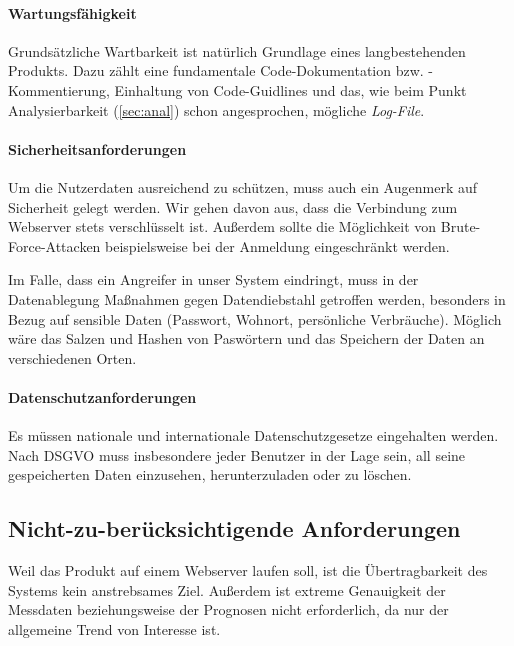 \paragraph{Wartungsfähigkeit}

Grundsätzliche Wartbarkeit ist natürlich Grundlage eines langbestehenden Produkts. Dazu zählt eine fundamentale Code-Dokumentation bzw. -Kommentierung, Einhaltung von Code-Guidlines und das, wie beim Punkt Analysierbarkeit (\ref{sec:anal}) schon angesprochen, mögliche \textit{Log-File}.


\paragraph{Sicherheitsanforderungen}
Um die Nutzerdaten ausreichend zu schützen, muss auch ein Augenmerk auf Sicherheit gelegt werden. Wir gehen davon aus, dass die Verbindung zum Webserver stets verschlüsselt ist. Außerdem sollte die Möglichkeit von Brute-Force-Attacken beispielsweise bei der Anmeldung eingeschränkt werden.

Im Falle, dass ein Angreifer in unser System eindringt, muss in der Datenablegung Maßnahmen gegen Datendiebstahl getroffen werden, besonders in Bezug auf sensible Daten (Passwort, Wohnort, persönliche Verbräuche). Möglich wäre das Salzen und Hashen von Paswörtern und das Speichern der Daten an verschiedenen Orten.

\paragraph{Datenschutzanforderungen}
Es müssen nationale und internationale Datenschutzgesetze eingehalten werden. Nach DSGVO muss insbesondere jeder Benutzer in der Lage sein, all seine gespeicherten Daten einzusehen, herunterzuladen oder zu löschen.

\subsection{Nicht-zu-berücksichtigende Anforderungen}
Weil das Produkt auf einem Webserver laufen soll, ist die Übertragbarkeit des Systems kein anstrebsames Ziel. Außerdem ist extreme Genauigkeit der Messdaten beziehungsweise der Prognosen nicht erforderlich, da nur der allgemeine Trend von Interesse ist.
